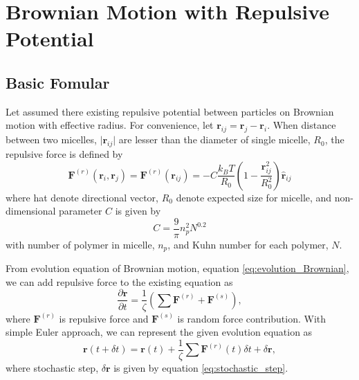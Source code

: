 \message{ !name(brief_Brownian_dynamics.tex)}\documentclass[10pt, a4paper]{report}
\begin{document}
\chapter{Brownian Motion with Repulsive Potential}
\section{Basic Fomular}
Let assumed there existing repulsive potential between particles on Brownian motion with effective radius. For convenience, let $\mathbf{r}_{ij} = \mathbf{r}_j - \mathbf{r}_i$. When distance between two micelles, $\lvert\mathbf{r}_{ij}\rvert$ are lesser than the diameter of single micelle, $R_0$, the repulsive force is defined by
\begin{equation}
\mathbf{F}^{(r)}(\mathbf{r}_i, \mathbf{r}_j) = \mathbf{F}^{(r)}(\mathbf{r}_{ij}) = -C\frac{k_BT}{R_0}\left(1 - \frac{\mathbf{r}_{ij}^2}{R_0^2}\right)\hat{\mathbf{r}}_{ij} \label{eq:force_repulsion}
\end{equation}
where hat denote directional vector, $R_0$ denote expected size for micelle, and non-dimensional parameter $C$ is given by
\begin{equation}
C = \frac{9}{\pi}n_p^2N^{0.2}
\end{equation}
with number of polymer in micelle, $n_p$, and Kuhn number for each polymer, $N$.


From evolution equation of Brownian motion, equation \eqref{eq:evolution_Brownian}, we can add repulsive force to the existing equation as
\begin{equation}
\frac{\partial \mathbf{r}}{\partial t} = \frac{1}{\zeta}\left(\sum \mathbf{F}^{(r)} + \mathbf{F}^{(s)}\right),\label{eq:evolution_Brownian_repulsion}
\end{equation}
where $\mathbf{F}^{(r)}$ is repulsive force and $\mathbf{F}^{(s)}$ is random force contribution. With simple Euler approach, we can represent the given evolution equation as
\begin{equation}
\mathbf{r}(t + \delta t) = \mathbf{r}(t) + \frac{1}{\zeta}\sum\mathbf{F}^{(r)}(t)\delta t + \delta \mathbf{r},\label{eq:update_position}
\end{equation}
where stochastic step, $\delta\mathbf{r}$ is given by equation \eqref{eq:stochastic_step}.
\end{document}
